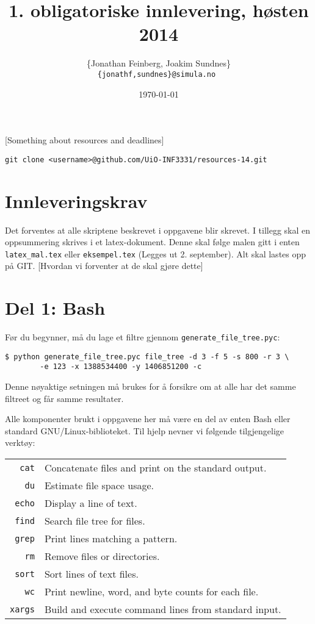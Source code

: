 \documentclass{article}
\author{
\{Jonathan Feinberg, Joakim Sundnes\} \\
\tt{\{jonathf,sundnes\}@simula.no}
}
\date{\today}
\title{1. obligatoriske innlevering, høsten 2014}
\begin{document}
\maketitle

[Something about resources and deadlines]
\begin{verbatim}
git clone <username>@github.com/UiO-INF3331/resources-14.git
\end{verbatim}

\section{Innleveringskrav}

Det forventes at alle skriptene beskrevet i oppgavene blir skrevet.
I tillegg skal en oppsummering skrives i et latex-dokument.
Denne skal følge malen gitt i enten \verb;latex_mal.tex; eller
\verb;eksempel.tex; (Legges ut 2. september).
Alt skal lastes opp på GIT.
[Hvordan vi forventer at de skal gjøre dette]

\section*{Del 1: Bash}

Før du begynner, må du lage et filtre gjennom
\verb;generate_file_tree.pyc;:
\begin{Verbatim}[fontsize=\small, frame=single]
$ python generate_file_tree.pyc file_tree -d 3 -f 5 -s 800 -r 3 \
        -e 123 -x 1388534400 -y 1406851200 -c
\end{Verbatim}
Denne nøyaktige setningen må brukes for å forsikre om at alle har
det samme filtreet og får samme resultater.

Alle komponenter brukt i oppgavene her må være en del av enten Bash
eller standard GNU/Linux-biblioteket.
Til hjelp nevner vi følgende tilgjengelige verktøy:

\begin{tabular}{rl}
    \verb;cat;      &   Concatenate files and print on the standard output. \\
    \verb;du;       &   Estimate file space usage. \\
    \verb;echo;     &   Display a line of text. \\
    \verb;find;     &   Search file tree for files. \\
    \verb;grep;     &   Print lines matching a pattern. \\
    \verb;rm;       &   Remove files or directories.\\
    \verb;sort;     &   Sort lines of text files. \\
    \verb;wc;       &   Print newline, word, and byte counts for each file. \\
    \verb;xargs;    &   Build and execute command lines from standard input.
\end{tabular}
\end{document}
